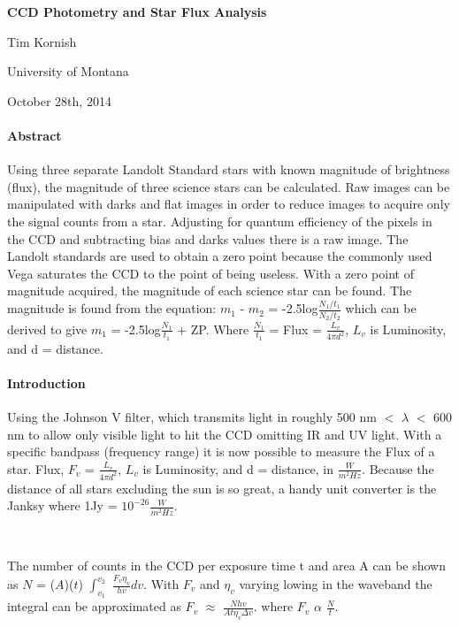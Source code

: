 \documentclass[12 pt,twoside]{article}
\begin{document}
\begin{center}

{\LARGE{\bf CCD Photometry and Star Flux Analysis}}

{\large Tim Kornish}

University of Montana

October 28th, 2014
\end{center}


\paragraph{Abstract}
Using three separate Landolt Standard stars with known magnitude of brightness (flux), the magnitude of three science stars can be calculated. Raw images can be manipulated with darks and flat images in order to reduce images to acquire only the signal counts from a star. Adjusting for quantum efficiency of the pixels in the CCD and subtracting bias and darks values there is a raw image. The Landolt standards are used to obtain a zero point because the commonly used Vega saturates the CCD to the point of being useless. With a zero point of magnitude acquired, the magnitude of each science star can be found. The magnitude is found from the equation: $m_1$ - $m_2$ = -2.5log$\frac{N_1/t_1}{N_2/t_2}$ which can be derived to give $m_1$  = -2.5log$\frac{N_1}{t_1}$ + ZP.  Where $\frac{N_1}{t_1}$ = Flux = $\frac{L_v}{4\pi d^2}$, $L_v$ is Luminosity, and d = distance.


\paragraph{Introduction}
Using the Johnson V filter, which transmits light in roughly 500 nm $<$ $\lambda$ $<$ 600 nm to allow only visible light to hit the CCD omitting IR and UV light. With a specific bandpass (frequency range) it is now possible to measure the Flux of a star. Flux, $F_v$ = $\frac{L_v}{4\pi d^2}$, $L_v$ is Luminosity, and d = distance, in $\frac{W}{m^2 Hz}$. Because the distance of all stars excluding the sun is so great, a handy unit converter is the Janksy where 1Jy = $10^{-26}$$\frac{W}{m^2 Hz}$. 

\ \

\indent
The number of counts in the CCD per exposure time t and area A can be shown as $N$ = ($A$)($t$) $\int_{v_1}^{v_2}$ $\frac{F_v\eta_v}{hv}$$dv$. With $F_v$ and $\eta_v$ varying lowing in the waveband the integral can be approximated as $F_v$ $\approx$ $ \frac{N hv}{A t \eta_v \Delta v}$. where $F_v$ $\alpha$ $\frac{N}{t}$. 
\end{document}
